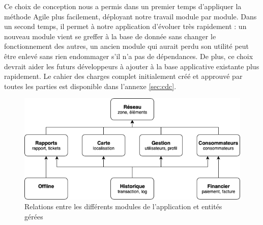 \documentclass{EPL-master-thesis-covers-FR}
\begin{document}
			Ce choix de conception nous a permis dans un premier temps d'appliquer la méthode Agile plus facilement, déployant notre travail module par module. Dans un second temps, il permet à notre application d'évoluer très rapidement : un nouveau module vient se greffer à la base de donnée sans changer le fonctionnement des autres, un ancien module qui aurait perdu son utilité peut être enlevé sans rien endommager s'il n'a pas de dépendances. De plus, ce choix devrait aider les futurs développeurs à ajouter à la base applicative existante plus rapidement. Le cahier des charges complet initialement créé et approuvé par toutes les parties est disponible dans l'annexe \ref{sec:cdc}.

			\begin{figure}
				\includegraphics[width=\textwidth]{images/modules}
				\caption{Relations entre les différents modules de l'application et entités gérées}
				\label{fig:modules}
			\end{figure}
\end{document}
